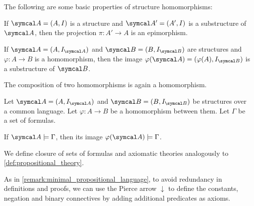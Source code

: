 \begin{proposition}\label{thm:first_order_homomorphism_properties}
  The following are some basic properties of structure homomorphisms:
  \begin{defenum}
     If \( \Cal{A} = (A, I) \) is a structure and \( \Cal{A'} = (A', I) \) is a substructure of \( \Cal{A} \), then the projection \( \pi: A' \to A \) is an epimorphism.

     If \( \Cal{A} = (A, I_{\Cal{A}}) \) and \( \Cal{B} = (B, I_{\Cal{B}}) \) are structures and \( \varphi: A \to B \) is a homomorphism, then the image \( \varphi(\Cal{A}) = (\varphi(A), I_{\Cal{B}}) \) is a substructure of \( \Cal{B} \).

     The composition of two homomorphisms is again a homomorphism.
  \end{defenum}
\end{proposition}

\begin{proposition}\label{thm:first_order_homomorphism_preserves_models}\cite[definition 23.8]{OpenLogic20201202}
  Let \( \Cal{A} = (A, I_{\Cal{A}}) \) and \( \Cal{B} = (B, I_{\Cal{B}}) \) be structures over a common language. Let \( \varphi: A \to B \) be a homomorphism between them. Let \( \Gamma \) be a set of formulas.

  If \( \Cal{A} \models \Gamma \), then its image \( \varphi(\Cal{A}) \models \Gamma \).
\end{proposition}

\begin{definition}\label{def:first_order_theory}
  We define closure of sets of formulas and axiomatic theories analogously to \cref{def:propositional_theory}.
\end{definition}

\begin{remark}\label{remark:minimal_first_order_language}
  As in \cref{remark:minimal_propositional_language}, to avoid redundancy in definitions and proofs, we can use the Pierce arrow \( \downarrow \) to define the constants, negation and binary connectives by adding additional predicates as axioms.
\end{remark}

